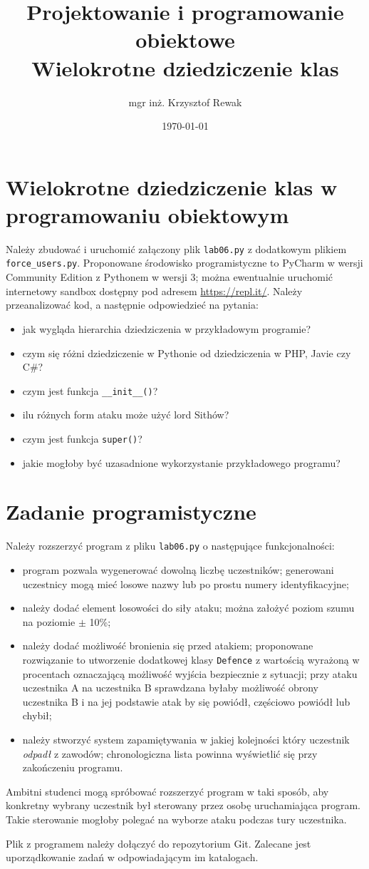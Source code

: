 \documentclass{article}
\title{
	Projektowanie i programowanie obiektowe \\
	\Huge{Wielokrotne dziedziczenie klas}
}
\author{mgr inż. Krzysztof Rewak}
\date{\today}
\begin{document}
	\maketitle

	\section{Wielokrotne dziedziczenie klas w programowaniu obiektowym}
	Należy zbudować i uruchomić załączony plik \texttt{lab06.py} z dodatkowym plikiem \texttt{force\_users.py}. Proponowane środowisko programistyczne to PyCharm w wersji Community Edition z Pythonem w wersji 3; można ewentualnie uruchomić internetowy sandbox dostępny pod adresem \url{https://repl.it/}. Należy przeanalizować kod, a następnie odpowiedzieć na pytania:
	\begin{itemize}
		\item jak wygląda hierarchia dziedziczenia w przykładowym programie?
		\item czym się różni dziedziczenie w Pythonie od dziedziczenia w PHP, Javie czy C\#?
		\item czym jest funkcja \texttt{\_\_init\_\_()}?
		\item ilu różnych form ataku może użyć lord Sithów?
		\item czym jest funkcja \texttt{super()}?
		\item jakie mogłoby być uzasadnione wykorzystanie przykładowego programu?
	\end{itemize}

	\section{Zadanie programistyczne}
	Należy rozszerzyć program z pliku \texttt{lab06.py} o następujące funkcjonalności:
	\begin{itemize}
		\item program pozwala wygenerować dowolną liczbę uczestników; generowani uczestnicy mogą mieć losowe nazwy lub po prostu numery identyfikacyjne; 
		\item należy dodać element losowości do siły ataku; można założyć poziom szumu na poziomie $\pm$ 10\%;
		\item należy dodać możliwość bronienia się przed atakiem; proponowane rozwiązanie to utworzenie dodatkowej klasy \texttt{Defence} z wartością wyrażoną w procentach oznaczającą możliwość wyjścia bezpiecznie z sytuacji; przy ataku uczestnika A na uczestnika B sprawdzana byłaby możliwość obrony uczestnika B i na jej podstawie atak by się powiódł, częściowo powiódł lub chybił;
		\item należy stworzyć system zapamiętywania w jakiej kolejności który uczestnik \emph{odpadł} z zawodów; chronologiczna lista powinna wyświetlić się przy zakończeniu programu.
	\end{itemize}
	
	Ambitni studenci mogą spróbować rozszerzyć program w taki sposób, aby konkretny wybrany uczestnik był sterowany przez osobę uruchamiająca program. Takie sterowanie mogłoby polegać na wyborze ataku podczas tury uczestnika.
	
	Plik z programem należy dołączyć do repozytorium Git. Zalecane jest uporządkowanie zadań w odpowiadającym im katalogach.
\end{document}
